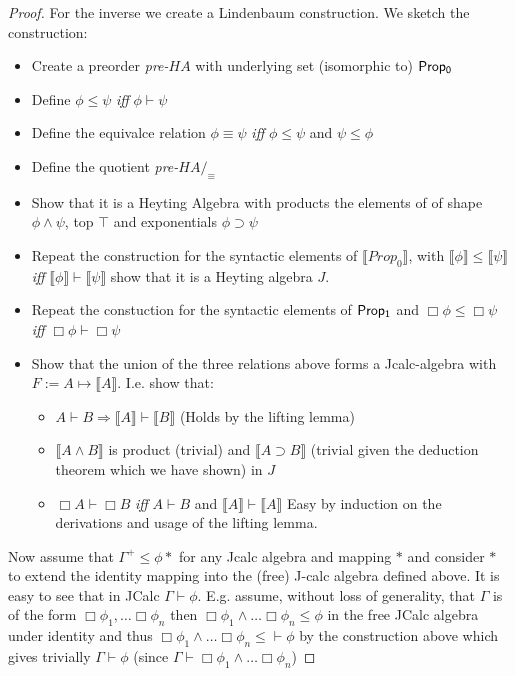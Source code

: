 \begin{proof}
				For the inverse we create a Lindenbaum construction. We sketch the construction:
				\begin{itemize}
					\item Create a preorder \textit{pre-}$HA$ with underlying set (isomorphic to) ${\sf Prop_0}$
					\item Define $\phi\le\psi$ {\textit{iff}} $\phi\vdash\psi$
					\item Define the equivalce relation $\phi\equiv\psi$ {\textit{iff}} 
					$\phi\le\psi$ and $\psi\le\phi$
					\item Define the quotient \textit{pre-}$HA/_{\equiv}$
					\item Show that it is a Heyting Algebra with products the elements of
					of shape $\phi\wedge\psi$, top $\top$ and exponentials $\phi\supset\psi$
					\item Repeat the construction for the syntactic elements of 
					$\llbracket Prop_0 \rrbracket$, with 
					$\llbracket\phi\rrbracket\le\llbracket\psi\rrbracket$ 
					\textit{iff} $\llbracket\phi\rrbracket\vdash\llbracket\psi\rrbracket$
					show that it is a Heyting algebra $J$.
					\item Repeat the constuction for the syntactic elements of
					 ${\sf Prop_1}$ and $\Box \phi\le\Box\psi$ \textit{iff} $\Box\phi\vdash\Box\psi$
					\item Show that the union of the three relations above forms a 
					Jcalc-algebra with $F:= A\mapsto \llbracket A\rrbracket$. I.e. show that:
					\begin{itemize}
						\item $A\vdash B\Rightarrow \llbracket A\rrbracket\vdash \llbracket B\rrbracket$
						(Holds by the lifting lemma)
						\item $\llbracket A\wedge B\rrbracket $ is product (trivial) and 
						$\llbracket A\supset B \rrbracket$ (trivial given the deduction theorem which we have shown)
						in $J$
						\item $\Box A\vdash\Box B$ \textit{iff} $A\vdash B$ and $\llbracket A\rrbracket \vdash \llbracket A\rrbracket$
						Easy by induction on the derivations and usage of the lifting lemma.
					\end{itemize}
				\end{itemize}
				Now assume that $\Gamma^{+}\le\phi*$ for any Jcalc algebra and 
				mapping $*$ and consider  $*$ to extend  the identity mapping  
				into the (free) J-calc algebra defined above. It is easy to see that in JCalc
				$\Gamma\vdash\phi$. E.g. assume, without loss of generality,
				that $\Gamma$ is of the form $\Box\phi_1,\ldots\Box\phi_n$ then
				$\Box\phi_1\wedge\ldots\Box\phi_n\le\phi$ in the free JCalc algebra
				under identity and
				thus $\Box\phi_1\wedge\ldots\Box\phi_n\le\vdash\phi$ by the construction above which
				gives trivially $\Gamma\vdash\phi$ (since $\Gamma\vdash\Box\phi_1\wedge\ldots\Box\phi_n$)

			\end{proof}

